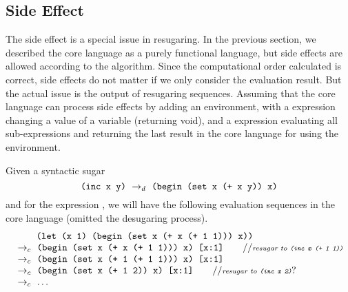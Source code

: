 \subsection{Side Effect}


The side effect is a special issue in resugaring. In the previous section, we described the core language as a purely functional language, but side effects are allowed according to the algorithm. Since the computational order calculated is correct, side effects do not matter if we only consider the evaluation result. But the actual issue is the output of resugaring sequences. Assuming that the core language can process side effects by adding an environment, with a  expression changing a value of a variable (returning void), and a  expression evaluating all sub-expressions and returning the last result in the core language for using the environment.

Given a syntactic sugar
\[\texttt{(inc x y)} ~\rightarrow_d~ \texttt{(begin (set x (+ x y)) x)}\]
and for the expression , we will have the following evaluation sequences in the core language (omitted the desugaring process).
\[
	\begin{array}{l}
		\qquad\;\texttt{(let (x 1) (begin (set x (+ x (+ 1 1))) x))}\\
	~\rightarrow_c~\texttt{(begin (set x (+ x (+ 1 1))) x) [x:1]} \qquad//{\scriptsize\emph{resugar to \texttt{(inc x (+ 1 1))}}}\\
	~\rightarrow_c~\texttt{(begin (set x (+ 1 (+ 1 1))) x) [x:1]} \\
	~\rightarrow_c~\texttt{(begin (set x (+ 1 2)) x) [x:1]} \qquad//{\scriptsize\emph{resugar to \texttt{(inc x 2)}}?}\\
	~\rightarrow_c~\ldots
	\end{array}
\]

